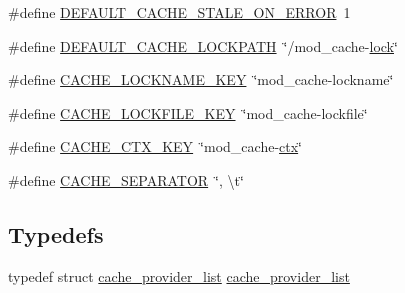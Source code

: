 \begin{DoxyCompactItemize}
\#define \hyperlink{group__Cache__util_gac909357ff2b12a32397146be2a3a8b74}{D\+E\+F\+A\+U\+L\+T\+\_\+\+C\+A\+C\+H\+E\+\_\+\+S\+T\+A\+L\+E\+\_\+\+O\+N\+\_\+\+E\+R\+R\+OR}~1
\item 
\#define \hyperlink{group__Cache__util_ga8529c15e3f5e3e6598f8313495f50598}{D\+E\+F\+A\+U\+L\+T\+\_\+\+C\+A\+C\+H\+E\+\_\+\+L\+O\+C\+K\+P\+A\+TH}~\char`\"{}/mod\+\_\+cache-\/\hyperlink{group__APR__Util__RMM_ga0353fe7d0bd33c38d9a7a57a73b6407e}{lock}\char`\"{}
\item 
\#define \hyperlink{group__Cache__util_gaa55455b9316bd74826d36a89914580b8}{C\+A\+C\+H\+E\+\_\+\+L\+O\+C\+K\+N\+A\+M\+E\+\_\+\+K\+EY}~\char`\"{}mod\+\_\+cache-\/lockname\char`\"{}
\item 
\#define \hyperlink{group__Cache__util_ga18f46c3a4173d016f51fce82d596fec7}{C\+A\+C\+H\+E\+\_\+\+L\+O\+C\+K\+F\+I\+L\+E\+\_\+\+K\+EY}~\char`\"{}mod\+\_\+cache-\/lockfile\char`\"{}
\item 
\#define \hyperlink{group__Cache__util_gac10632e313af1b7ac2c619b65290f5d7}{C\+A\+C\+H\+E\+\_\+\+C\+T\+X\+\_\+\+K\+EY}~\char`\"{}mod\+\_\+cache-\/\hyperlink{group__APR__Util__Bucket__Brigades_ga0525238c5b09cb4ac5067ddec654d09c}{ctx}\char`\"{}
\item 
\#define \hyperlink{group__Cache__util_ga2916636af38fdf277cb80c1c698c291a}{C\+A\+C\+H\+E\+\_\+\+S\+E\+P\+A\+R\+A\+T\+OR}~\char`\"{}, \textbackslash{}t\char`\"{}
\end{DoxyCompactItemize}
\subsection*{Typedefs}
\begin{DoxyCompactItemize}
\item 
typedef struct \hyperlink{structcache__provider__list}{cache\+\_\+provider\+\_\+list} \hyperlink{group__Cache__util_gaf1d145ae80afe048c683ac2da4e9c298}{cache\+\_\+provider\+\_\+list}
\end{DoxyCompactItemize}
